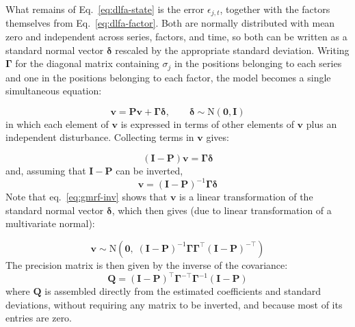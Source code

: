 \documentclass[12pt]{article}
\begin{document}
What remains of Eq.~\ref{eq:dlfa-state} is the error $\epsilon_{j,t}$,
together with the factors themselves from Eq.~\ref{eq:dlfa-factor}. Both
are normally distributed with mean zero and independent across series,
factors, and time, so both can be written as a standard normal vector
$\boldsymbol\delta$ rescaled by the appropriate standard deviation.
Writing $\boldsymbol\Gamma$ for the diagonal matrix containing
$\sigma_j$ in the positions belonging to each series and one in the
positions belonging to each factor, the model becomes a single
simultaneous equation:

\begin{equation}
  \mathbf{v} = \mathbf{P}\mathbf{v} + \boldsymbol\Gamma
  \boldsymbol\delta, \qquad
  \boldsymbol\delta \sim \mathrm{N}\!\left(\mathbf{0}, \mathbf{I}\right)
  \label{eq:gmrf-sem}
\end{equation}
in which each element of $\mathbf{v}$ is expressed in terms of other
elements of $\mathbf{v}$ plus an independent disturbance. Collecting
terms in $\mathbf{v}$ gives:

\begin{equation}
  \left(\mathbf{I} - \mathbf{P}\right)\mathbf{v} =
  \boldsymbol\Gamma \boldsymbol\delta
  \label{eq:gmrf-solve}
\end{equation}
and, assuming that $\mathbf{I} - \mathbf{P}$ can be inverted,
\begin{equation}
  \mathbf{v} = \left(\mathbf{I} - \mathbf{P}\right)^{-1}
  \boldsymbol\Gamma \boldsymbol\delta
  \label{eq:gmrf-inv}
\end{equation}
Note that eq.~\ref{eq:gmrf-inv} shows that $\mathbf{v}$ is a linear
transformation of the standard normal vector $\boldsymbol\delta$, which
then gives (due to linear transformation of a multivariate normal):

\begin{equation}
  \mathbf{v} \sim \mathrm{N}\!\left(\mathbf{0},\;
  \left(\mathbf{I} - \mathbf{P}\right)^{-1}
  \boldsymbol\Gamma \boldsymbol\Gamma^\top
  \left(\mathbf{I} - \mathbf{P}\right)^{-\top}\right)
  \label{eq:gmrf-cov}
\end{equation}
The precision matrix is then given by the inverse of the covariance:
\begin{equation}
  \mathbf{Q} = \left(\mathbf{I} - \mathbf{P}\right)^\top
               \boldsymbol\Gamma^{-\top}
               \boldsymbol\Gamma^{-1}
               \left(\mathbf{I} - \mathbf{P}\right)
  \label{eq:gmrf-Q}
\end{equation}
where $\mathbf{Q}$ is assembled directly from the estimated coefficients
and standard deviations, without requiring any matrix to be inverted,
and because most of its entries are zero.
\end{document}
